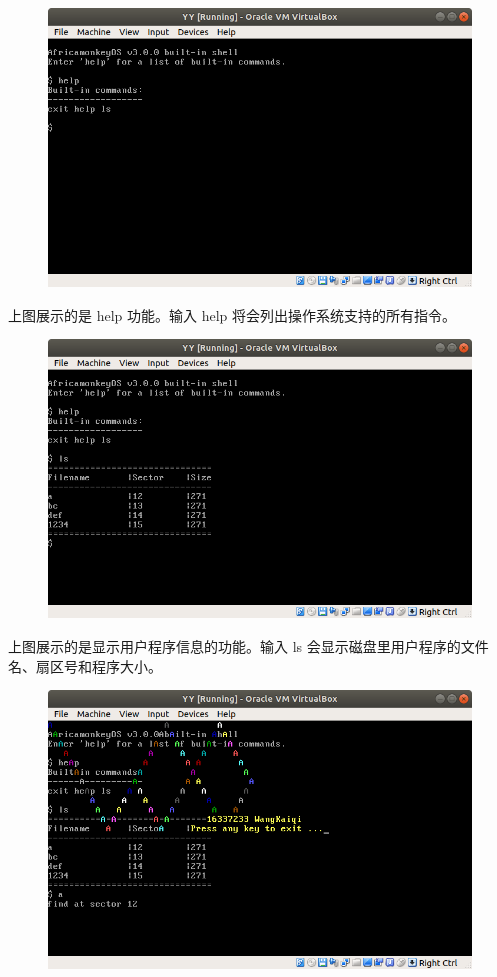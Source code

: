 \documentclass{article}
\begin{document}
\begin{figure}[!hbp]
	\centering
	\includegraphics[scale=0.55]{pics/2.png}
\end{figure}

上图展示的是 help 功能。输入 help 将会列出操作系统支持的所有指令。

\newpage

\begin{figure}[!hbp]
	\centering
	\includegraphics[scale=0.55]{pics/3.png}
\end{figure}

上图展示的是显示用户程序信息的功能。输入 ls 会显示磁盘里用户程序的文件名、扇区号和程序大小。

\begin{figure}[!hbp]
	\centering
	\includegraphics[scale=0.55]{pics/4.png}
\end{figure}
\end{document}
